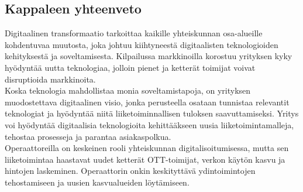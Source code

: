 \documentclass[finnish,12pt,a4paper,pdftex]{article}
\begin{document}







\subsection{Kappaleen yhteenveto}

Digitaalinen transformaatio tarkoittaa kaikille yhteiskunnan osa-alueille kohdentuvaa muutosta, joka johtuu kiihtyneestä digitaalisten teknologioiden kehityksestä ja soveltamisesta. 
Kilpailussa markkinoilla korostuu yrityksen kyky hyödyntää uutta teknologiaa, jolloin pienet ja ketterät toimijat voivat disruptioida markkinoita.\\

\noindent Koska teknologia mahdollistaa monia soveltamistapoja, on yrityksen muodostettava digitaalinen visio, jonka perusteella osataan tunnistaa relevantit teknologiat ja hyödyntää niitä liiketoiminnallisen tuloksen saavuttamiseksi. Yritys voi hyödyntää digitaalisia teknologioita kehittääkseen uusia liiketoimintamalleja, tehostaa prosesseja ja parantaa asiakaspolkua.\\

\noindent Operaattoreilla on keskeinen rooli yhteiskunnan digitalisoitumisessa, mutta sen liiketoimintaa haastavat uudet ketterät OTT-toimijat, verkon käytön kasvu ja hintojen laskeminen. Operaattorin onkin keskityttävä ydintoimintojen tehostamiseen ja uusien kasvualueiden löytämiseen.\\



\end{document}
